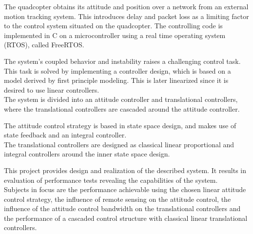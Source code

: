 The quadcopter obtains its attitude and position over a network from an external motion tracking system. This introduces delay and packet loss as a limiting factor to the control system situated on the quadcopter. The controlling code is implemented in C on a microcontroller using a real time operating system (RTOS), called FreeRTOS.

The system's coupled behavior and instability raises a challenging control task. This task is solved by implementing a controller design, which is based on a model derived by first principle modeling. This is later linearized since it is desired to use linear controllers.\\
The system is divided into an attitude controller and translational controllers, where the translational controllers are cascaded around the attitude controller.

The attitude control strategy is based in state space design, and makes use of state feedback and an integral controller.\\
The translational controllers are designed as classical linear proportional and integral controllers around the inner state space design.

This project provides design and realization of the described system. It results in evaluation of performance tests revealing the capabilities of the system.\\
Subjects in focus are the performance achievable using the chosen linear attitude control strategy, the influence of remote sensing on the attitude control, the influence of the attitude control bandwidth on the translational controllers and the performance of a cascaded control structure with classical linear translational controllers.

